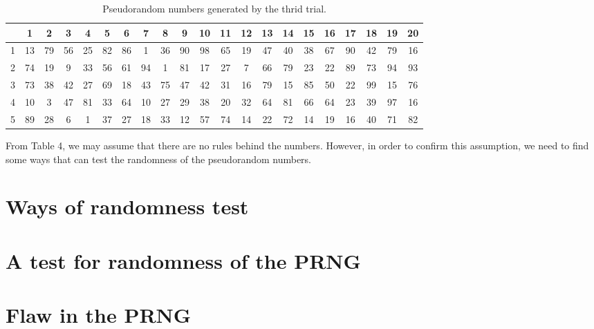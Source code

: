 \documentclass[a4paper]{article}
\begin{document}
\begin{center}
\begin{table}[H]
\centering
\begin{tabular}{|c|cccccccccccccccccccc|}
\hline
  & 1  & 2  & 3  & 4  & 5  & 6  & 7  & 8  & 9  & 10 & 11 & 12 & 13 & 14 & 15 & 16 & 17 & 18 & 19 & 20 \\ \hline
1 & 13 & 79 & 56 & 25 & 82 & 86 & 1  & 36 & 90 & 98 & 65 & 19 & 47 & 40 & 38 & 67 & 90 & 42 & 79 & 16 \\
2 & 74 & 19 & 9  & 33 & 56 & 61 & 94 & 1  & 81 & 17 & 27 & 7  & 66 & 79 & 23 & 22 & 89 & 73 & 94 & 93 \\
3 & 73 & 38 & 42 & 27 & 69 & 18 & 43 & 75 & 47 & 42 & 31 & 16 & 79 & 15 & 85 & 50 & 22 & 99 & 15 & 76 \\
4 & 10 & 3  & 47 & 81 & 33 & 64 & 10 & 27 & 29 & 38 & 20 & 32 & 64 & 81 & 66 & 64 & 23 & 39 & 97 & 16 \\
5 & 89 & 28 & 6  & 1  & 37 & 27 & 18 & 33 & 12 & 57 & 74 & 14 & 22 & 72 & 14 & 19 & 16 & 40 & 71 & 82 \\ \hline
\end{tabular}
\caption{Pseudorandom numbers generated by the thrid trial.}
\end{table}
\end{center}

	From Table 4, we may assume that there are no rules behind the numbers. However, in order to confirm this assumption, we need to find some ways that can test the randomness of the pseudorandom numbers.

















\section{Ways of randomness test}

\section{A test for randomness of the PRNG}

\section{Flaw in the PRNG}
\end{document}
